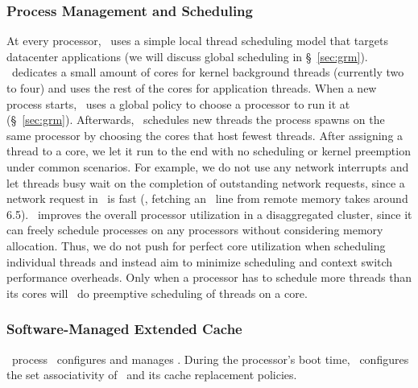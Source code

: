 \documentclass[10pt,times,twocolumn]{z2-article}
\begin{document}
{{{{{{{\subsubsection{Process Management and Scheduling}
At every processor, \lego\ uses a simple local thread scheduling model 
that targets datacenter applications 
(we will discuss global scheduling in \S~\ref{sec:grm}).
\lego\ dedicates a small amount of cores for kernel background threads 
(currently two to four)
and uses the rest of the cores for application threads.
When a new process starts, \lego\ uses a global policy to choose a processor to run it at (\S~\ref{sec:grm}).
Afterwards, \lego\ schedules new threads the process spawns on the same processor 
by choosing the cores that host fewest threads.
After assigning a thread to a core, 
we let it run to the end with no scheduling or kernel preemption under common scenarios.
For example, we do not use any network interrupts 
and let threads busy wait on the completion of outstanding network requests, 
since a network request in \lego\ is fast 
(\eg, fetching an \excache\ line from remote memory takes around 6.5\mus).
\lego\ improves the overall processor utilization in a disaggregated cluster,
since it can freely schedule processes on any processors without considering memory allocation.
Thus, we do not push for perfect core utilization when scheduling individual threads
and instead aim to minimize scheduling and context switch performance overheads.
Only when a processor has to schedule %
more threads than its cores will
\lego\ do preemptive scheduling of threads on a core.


\subsubsection{Software-Managed Extended Cache}
\lego\ process \microos\ configures and manages \excache.
During the processor's boot time, \lego\ configures the set associativity of \excache\
and its cache replacement policies.

}}}}}}}
\end{document}
